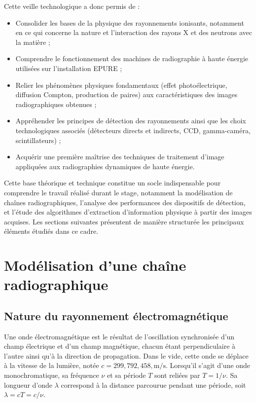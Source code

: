 \documentclass[12pt,a4paper]{report}
\begin{document}
Cette veille technologique a donc permis de :
\begin{itemize}
  \item Consolider les bases de la physique des rayonnements ionisants, notamment en ce qui concerne la nature et l’interaction des rayons X et des neutrons avec la matière ;
  \item Comprendre le fonctionnement des machines de radiographie à haute énergie utilisées sur l’installation EPURE ;
  \item Relier les phénomènes physiques fondamentaux (effet photoélectrique, diffusion Compton, production de paires) aux caractéristiques des images radiographiques obtenues ;
  \item Appréhender les principes de détection des rayonnements ainsi que les choix technologiques associés (détecteurs directs et indirects, CCD, gamma-caméra, scintillateurs) ;
  \item Acquérir une première maîtrise des techniques de traitement d’image appliquées aux radiographies dynamiques de haute énergie.
\end{itemize}

Cette base théorique et technique constitue un socle indispensable pour comprendre le travail réalisé durant le stage, notamment la modélisation de chaînes radiographiques, l’analyse des performances des dispositifs de détection, et l’étude des algorithmes d’extraction d’information physique à partir des images acquises. Les sections suivantes présentent de manière structurée les principaux éléments étudiés dans ce cadre.

\section{Modélisation d'une chaîne radiographique}
\subsection{Nature du rayonnement électromagnétique}
Une onde électromagnétique est le résultat de l’oscillation synchronisée d’un champ électrique et d’un champ magnétique, chacun étant perpendiculaire à l’autre ainsi qu’à la direction de propagation. Dans le vide, cette onde se déplace à la vitesse de la lumière, notée $c = 299,792,458 , \text{m/s}$. Lorsqu’il s’agit d’une onde monochromatique, sa fréquence $\nu$ et sa période $T$ sont reliées par $T = 1/\nu$. Sa longueur d’onde $\lambda$ correspond à la distance parcourue pendant une période, soit $\lambda = c T = c/\nu$.
\end{document}
